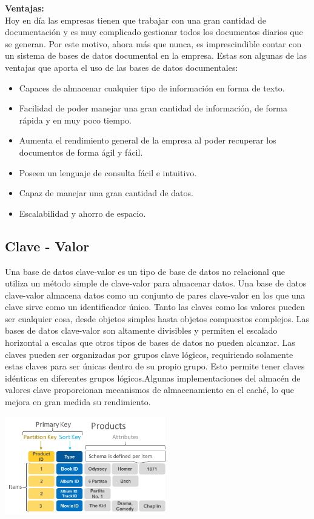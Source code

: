\documentclass[twoside,twocolumn]{article}
\begin{document}
	\textbf{Ventajas:}
\\
Hoy en día las empresas tienen que trabajar con una gran cantidad de documentación y es muy complicado gestionar todos los documentos diarios que se generan. Por este motivo, ahora más que nunca, es imprescindible contar con un sistema de bases de datos documental en la empresa. Estas son algunas de las ventajas que aporta el uso de las bases de datos documentales:
\begin{itemize}	

	\item Capaces de almacenar cualquier tipo de información en forma de texto.
	\item Facilidad de poder manejar una gran cantidad de información, de forma rápida y en muy poco tiempo.
	\item Aumenta el rendimiento general de la empresa al poder recuperar los documentos de forma ágil y fácil.
	\item Poseen un lenguaje de consulta fácil e intuitivo.
	\item Capaz de manejar una gran cantidad de datos.
	\item Escalabilidad y ahorro de espacio.

\end{itemize} 



\subsection{Clave - Valor}
Una base de datos clave-valor es un tipo de base de datos no relacional que utiliza un método simple de clave-valor para almacenar datos. Una base de datos clave-valor almacena datos como un conjunto de pares clave-valor en los que una clave sirve como un identificador único. Tanto las claves como los valores pueden ser cualquier cosa, desde objetos simples hasta objetos compuestos complejos. Las bases de datos clave-valor son altamente divisibles y permiten el escalado horizontal a escalas que otros tipos de bases de datos no pueden alcanzar.
Las claves pueden ser organizadas por grupos clave lógicos, requiriendo solamente estas claves para ser únicas dentro de su propio grupo. Esto permite tener claves idénticas en diferentes grupos lógicos.Algunas implementaciones del almacén de valores clave proporcionan mecanismos de almacenamiento en el caché, lo que mejora en gran medida su rendimiento.
\begin{center}
	\includegraphics[width=7cm]{./Imagenes/clavevalor} 
\end{center}
\end{document}
